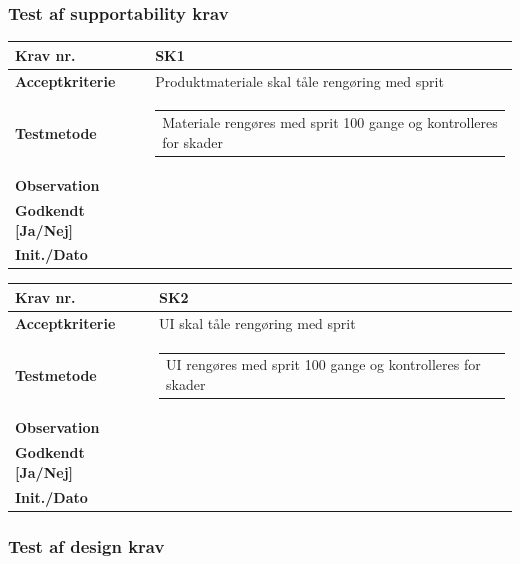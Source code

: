 \vspace{5mm}

\subsubsection{Test af supportability krav}

\begin{tabularx}{1\textwidth}{|l|X|}
\hline
\textbf{Krav nr.}              & SK1  \\ \hline
\textbf{Acceptkriterie}        & Produktmateriale skal tåle rengøring med sprit \\ \hline
\textbf{Testmetode}            & \begin{tabular}[l]{@{}l@{}} Materiale rengøres med sprit 100 gange og kontrolleres for skader \end{tabular}  \\ \hline
\textbf{Observation}           &  \\ \hline
\textbf{Godkendt {[}Ja/Nej{]}} &  \\ \hline
\textbf{Init./Dato}            &  \\ \hline
\end{tabularx}

\begin{tabularx}{1\textwidth}{|l|X|}
\hline
\textbf{Krav nr.}              & SK2  \\ \hline
\textbf{Acceptkriterie}        & UI skal tåle rengøring med sprit \\ \hline
\textbf{Testmetode}            & \begin{tabular}[l]{@{}l@{}} UI rengøres med sprit 100 gange og kontrolleres for skader \end{tabular}  \\ \hline
\textbf{Observation}           &  \\ \hline
\textbf{Godkendt {[}Ja/Nej{]}} &  \\ \hline
\textbf{Init./Dato}            &  \\ \hline
\end{tabularx}

\vspace{5mm}

\subsubsection{Test af design krav}

